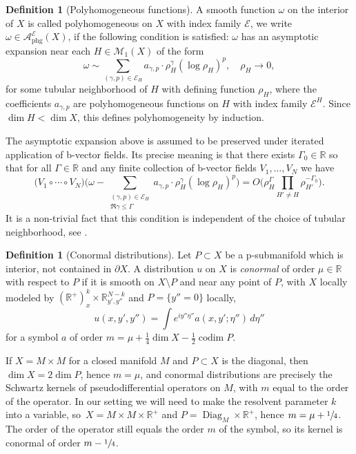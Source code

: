 \documentclass[JEP,XML,SOM,Unicode,NoFloatCountersInSection,published]{cedram}
\theoremstyle{plain}
\theoremstyle{definition}
\newtheorem{defn}[Th]{Definition}
\newcommand{\R}{{\mathbb{R}}}
\newcommand\calE{{\mathcal E}}
\newcommand\calM{{\mathcal M}}
\newcommand {\phg}{{\mathrm{phg}}}
\DeclareMathOperator{\codim}{codim}
\DeclareMathOperator{\Diag}{Diag}
\begin{document}
\begin{defn}[Polyhomogeneous functions] A smooth function $\omega$ on the interior of $X$ is called polyhomogeneous
on $X$ with index family $\calE$, we write $ \omega \in \mathcal{A}^{\calE}_{\phg}(X)$, if the following condition is satisfied:
$\omega$ has an asymptotic
expansion near each \hbox{$H\in\calM_1(X)$} of the form
\[
\omega \sim \sum_{(\gamma,p) \in \calE_{H}} a_{\gamma,p} \cdot \rho_{H}^{\gamma}
(\log\rho_H)^{p}, \quad \rho_{H} \to 0,
\]
for some tubular neighborhood of $H$ with defining function $\rho_H$, where the coefficients $a_{\gamma,p}$ are
polyhomogeneous functions on $H$ with index family $\calE^H$.
Since \hbox{$\dim H < \dim X$}, this defines polyhomogeneity by induction.

The asymptotic expansion above is assumed to be preserved under iterated application of b-vector fields. Its precise meaning is that there exists $\Gamma_0\in\R$ so that for all $\Gamma\in\R$ and any finite collection of b-vector fields $V_1,\dots, V_N$ we have
\[
\bigl(V_1 \circ \cdots \circ V_N \bigr) \biggl(
\omega - \sum_{\substack{(\gamma,p) \in \calE_{H}\\\Re\gamma\leq\Gamma}} a_{\gamma,p} \cdot \rho_{H}^{\gamma}
(\log\rho_H)^{p} \biggr)\textstyle
= O \bigl(\rho_H^\Gamma \prod_{H'\neq H} \rho_{H'}^{-\Gamma_0}\bigr).
\]
It is a non-trivial fact that this condition is independent of the choice of tubular neighborhood, see \cite{Mel:CCDMWC}.
\end{defn}

\begin{defn}
[Conormal distributions] \label{def:conormal distr}
Let $P\subset X$ be a p-submanifold which is interior, \ie not contained in $\partial X$.
A distribution $u$ on $X$ is \emph{conormal} of order $\mu\in\R$ with respect to $P$ if it is smooth on $X\setminus P$ and near any point of $P$, with $X$ locally modeled by $(\R^+)^k_x \times \R^{N-k}_{y',y''}$ and $P=\{y''=0\}$ locally,
\begin{equation}
\label{eqn:def conormal}
u(x,y',y'') = \int e^{iy''\eta''}a(x,y';\eta'')\,d\eta''
\end{equation}
for a symbol $a$ of order $m=\mu+\frac14\dim X - \frac12\codim P$.
\end{defn}
If $X=M\times M$ for a closed manifold $M$ and $P\subset X$ is the diagonal,
then $\dim X=2\dim P$, hence $m=\mu$, and conormal distributions are precisely the Schwartz kernels of pseudodifferential operators on $M$,
with $m$ equal to the order of the operator. In our setting we will need to make the resolvent parameter $k$ into a variable, so~$X=M\times M\times\R^+$ and $P=\Diag_M\times\R^+$, hence $m=\mu+\sfrac14$. The order of the operator still equals the order $m$ of the symbol, so its kernel is conormal of order $m-\sfrac14$.
\end{document}
